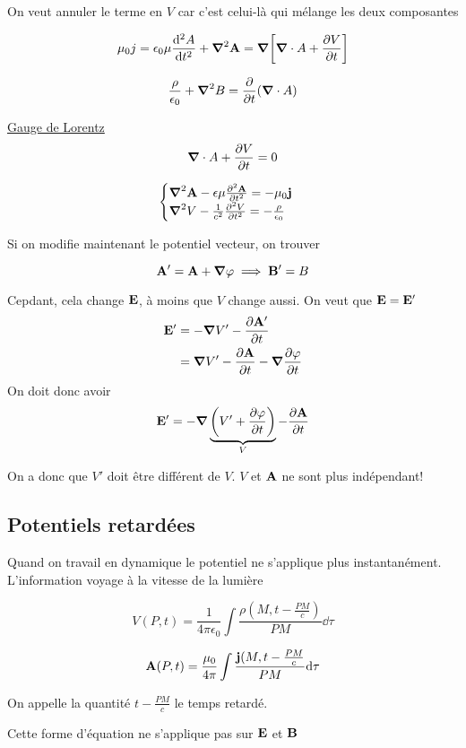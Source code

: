 On veut annuler le terme en $V$ car c'est celui-là qui mélange les deux composantes 

$$\mu_{0} j = \epsilon_{0} \mu \dv[2]{A}{t} + \grad^2 \vb{A} = \grad \qty[\grad \cdot A + \pdv{V}{t}]$$ 

$$\frac{\rho}{\epsilon_0} + \grad^2 B = \pdv{t}(\grad \cdot A)$$ 

\underline{Gauge de Lorentz} 
$$\grad \cdot A + \pdv{V}{t} = 0$$ 

$$\begin{cases}
	\grad^2 \vb{A} - \epsilon\mu \pdv[2]{\vb{A}}{t} = -\mu_0 \vb{j}\\
	\grad^2 V -\frac{1}{c^2} \pdv[2]{V}{t} = -\frac{\rho}{\epsilon_0} 
\end{cases}$$ 

Si on modifie maintenant le potentiel vecteur, on trouver

$$\vb{A}' = \vb{A} + \grad\varphi \implies \vb{B}' = B$$ 

Cepdant, cela change $\vb{E}$, à moins que $V$ change aussi. On veut que $\vb{E}= \vb{E}'$   
$$\begin{aligned} \vb{E}' &= -\grad V' - \pdv{\vb{A}'}{t}\\
	&= \grad V' - \pdv{\vb{A}}{t} -\grad \pdv{\varphi}{t}	
\end{aligned}$$ 
$$$$ 
On doit donc avoir $$\vb{E}' = - \grad \underbrace{\left( V' +\pdv{\varphi}{t} \right)}_{V} -\pdv{\vb{A}}{t} $$ 

On a donc que $V'$ doit être différent de $V$. $V$ et $\vb{A}$ ne sont plus indépendant!    


\subsection*{Potentiels retardées}

Quand on travail en dynamique le potentiel ne s'applique plus instantanément. L'information voyage à la vitesse de la lumière

$$V(P,t) = \frac{1}{4\pi\epsilon_0} \int \frac{\rho(M,t-\frac{PM}{c} )}{PM} \dd \tau$$ 

$$\vb{A}(P,t) = \frac{\mu_{0}}{4\pi} \int \frac{\vb{j}(M,t - \frac{PM}{c}}{PM} \dd \tau$$ 

On appelle la quantité $t - \frac{PM}{c}$ le temps retardé.

Cette forme d'équation ne s'applique pas sur $\vb{E}$ et $\vb{B}$




